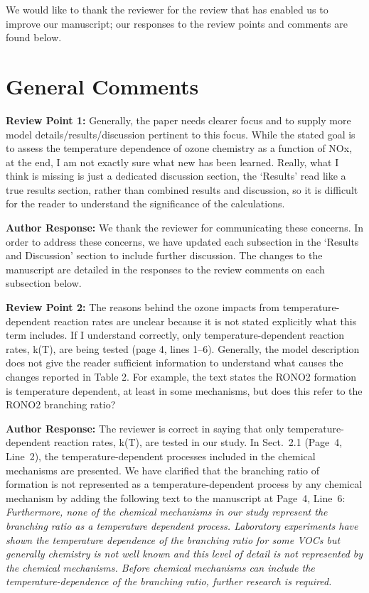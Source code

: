 \documentclass{article}
\begin{document}
We would like to thank the reviewer for the review that has enabled us to improve our manuscript; our responses to the review points and comments are found below.

\section*{General Comments}

\textbf{Review Point 1:}  Generally, the paper needs clearer focus and to supply more model details/results/discussion pertinent to this focus. While the stated goal is to assess the temperature dependence of ozone chemistry as a function of NOx, at the end, I am not exactly sure what new has been learned. Really, what I think is missing is just a dedicated discussion section, the `Results' read like a true results section, rather than combined results and discussion, so it is difficult for the reader to understand the significance of the calculations.

\textbf{Author Response:} We thank the reviewer for communicating these concerns. In order to address these concerns, we have updated each subsection in the `Results and Discussion' section to include further discussion. The changes to the manuscript are detailed in the responses to the review comments on each subsection below.

\textbf{Review Point 2:} The reasons behind the ozone impacts from temperature-dependent reaction rates are unclear because it is not stated explicitly what this term includes. If I understand correctly, only temperature-dependent reaction rates, k(T), are being tested (page 4, lines 1–6). Generally, the model description does not give the reader sufficient information to understand what causes the changes reported in Table 2. For example, the text states the RONO2 formation is temperature dependent, at least in some mechanisms, but does this refer to the RONO2 branching ratio?

\textbf{Author Response:} The reviewer is correct in saying that only temperature-dependent reaction rates, k(T), are tested in our study. In Sect.~2.1 (Page~4, Line~2), the temperature-dependent processes included in the chemical mechanisms are presented. We have clarified that the branching ratio of  formation is not represented as a temperature-dependent process by any chemical mechanism by adding the following text to the manuscript at Page~4, Line~6: 
\textit{
Furthermore, none of the chemical mechanisms in our study represent the  branching ratio as a temperature dependent process. 
Laboratory experiments have shown the temperature dependence of the  branching ratio for some VOCs \citep{Atkinson:1987} but generally  chemistry is not well known \citep{Pusede:2015} and this level of detail is not represented by the chemical mechanisms.
Before chemical mechanisms can include the temperature-dependence of the  branching ratio, further research is required.
}
\end{document}
